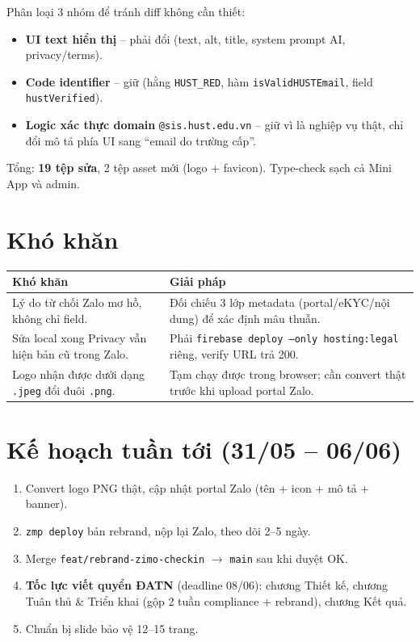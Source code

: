 \documentclass{article}
\begin{document}
Phân loại 3 nhóm để tránh diff không cần thiết:

\begin{itemize}[leftmargin=1.5em]
  \item \textbf{UI text hiển thị} -- phải đổi (text, alt, title, system prompt AI, privacy/terms).
  \item \textbf{Code identifier} -- giữ (hằng \texttt{HUST\_RED}, hàm \texttt{isValidHUSTEmail}, field \texttt{hustVerified}).
  \item \textbf{Logic xác thực domain} \texttt{@sis.hust.edu.vn} -- giữ vì là nghiệp vụ thật, chỉ đổi mô tả phía UI sang ``email do trường cấp''.
\end{itemize}

Tổng: \textbf{19 tệp sửa}, 2 tệp asset mới (logo + favicon). Type-check sạch cả Mini App và admin.

\section{Khó khăn}

\begin{tabularx}{\textwidth}{@{}X X@{}}
\toprule
\textbf{Khó khăn} & \textbf{Giải pháp} \\
\midrule
Lý do từ chối Zalo mơ hồ, không chỉ field. & Đối chiếu 3 lớp metadata (portal/eKYC/nội dung) để xác định mâu thuẫn. \\
\addlinespace
Sửa local xong Privacy vẫn hiện bản cũ trong Zalo. & Phải \texttt{firebase deploy --only hosting:legal} riêng, verify URL trả 200. \\
\addlinespace
Logo nhận được dưới dạng \texttt{.jpeg} đổi đuôi \texttt{.png}. & Tạm chạy được trong browser; cần convert thật trước khi upload portal Zalo. \\
\bottomrule
\end{tabularx}

\section{Kế hoạch tuần tới (31/05 -- 06/06)}

\begin{enumerate}[leftmargin=1.5em]
  \item Convert logo PNG thật, cập nhật portal Zalo (tên + icon + mô tả + banner).
  \item \texttt{zmp deploy} bản rebrand, nộp lại Zalo, theo dõi 2--5 ngày.
  \item Merge \texttt{feat/rebrand-zimo-checkin} $\to$ \texttt{main} sau khi duyệt OK.
  \item \textbf{Tốc lực viết quyển ĐATN} (deadline 08/06): chương Thiết kế, chương Tuân thủ \& Triển khai (gộp 2 tuần compliance + rebrand), chương Kết quả.
  \item Chuẩn bị slide bảo vệ 12--15 trang.
\end{enumerate}
\end{document}
